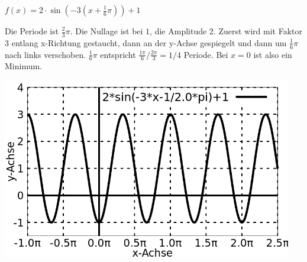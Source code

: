 \item $f(x) = 2\cdot\sin\left(-3(x+\frac{1}{6}\pi)\right)+1$

Die Periode ist $\frac{2}{3}\pi$. Die Nullage ist bei $1$, die Amplitude $2$. Zuerst wird mit Faktor $3$ entlang x-Richtung gestaucht, dann an der y-Achse gespiegelt und dann um $\frac{1}{6}\pi$ nach links verschoben. $\frac{1}{6}\pi$ entspricht $\frac{1\pi}{6} / \frac{2\pi}{3} = 1/4$ Periode. Bei $x=0$ ist also ein Minimum.

\begin{center}
  \includegraphics[width=0.95\textwidth]{../tex-snippets/ex-fn-transform-5-a.png}
\end{center}

